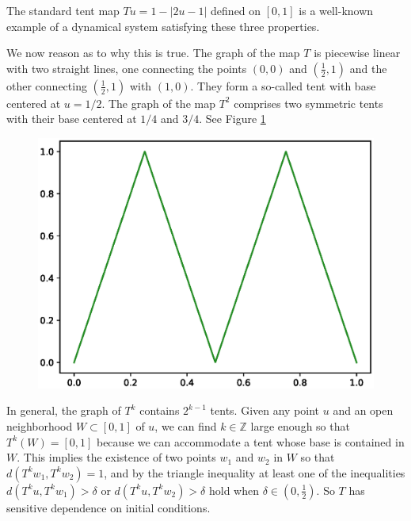 \begin{Example} \rm
  The standard tent map $Tu=1-|2u-1|$ defined on $[0,1]$ is a well-known example of a dynamical system satisfying these three properties. 

  We now reason as to why this is true. The graph of the map $T$ is piecewise linear with two straight lines, one connecting the points $(0,0)$ and $(\frac{1}{2},1)$ and the other connecting $(\frac{1}{2},1)$ with $(1,0)$. They form a so-called tent with base centered at $u=1/2$. The graph of the map $T^2$ comprises two symmetric tents with their base centered at $1/4$ and $3/4$. See Figure \ref{fig:T2tentmap}

  \begin{figure}[ht]
    \includegraphics[scale=0.6]{Graphs/_tentmap_2.eps}
        \centering
        \label{fig:T2tentmap}
  \end{figure}
  
  In general, the graph of  $T^k$ contains $2^{k-1}$ tents.
  Given any point $u$ and an open neighborhood $W \subset[0,1]$ of $u$, we can find $k\in\mathbb{Z}$ large enough so that $T^k(W) = [0,1]$ because we can accommodate a tent whose base is contained in $W$. %
  This implies the existence of two points $w_1$ and $w_2$ in $W$ so that $d(T^kw_1,T^kw_2)= 1$, and by the triangle inequality  at least one of the inequalities $d(T^ku,T^kw_1)> \delta$ or $d(T^ku,T^kw_2)> \delta$ hold when $\delta\in (0,\frac{1}{2})$.  So $T$ has sensitive dependence on initial conditions.
  

\end{Example}
